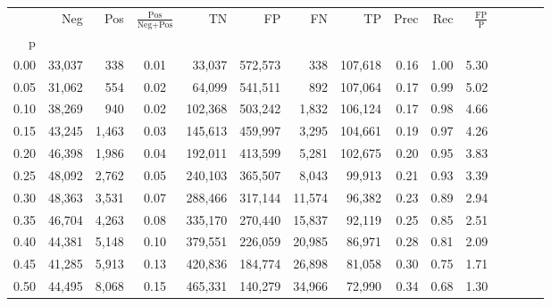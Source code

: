 \begin{tabular}{rrrcrrrrrrrrrrr}
\toprule
{} &     Neg &     Pos & $\frac{\text{Pos}}{\text{Neg}+\text{Pos}}$ &       TN &       FP &       FN &       TP &  Prec &   Rec & $\frac{\text{FP}}{\text{P}}$ \\
p    &         &         &                                            &          &          &          &          &       &       &                              \\
\midrule
0.00 &  33,037 &     338 &                                       0.01 &   33,037 &  572,573 &      338 &  107,618 &  0.16 &  1.00 &                         5.30 \\
0.05 &  31,062 &     554 &                                       0.02 &   64,099 &  541,511 &      892 &  107,064 &  0.17 &  0.99 &                         5.02 \\
0.10 &  38,269 &     940 &                                       0.02 &  102,368 &  503,242 &    1,832 &  106,124 &  0.17 &  0.98 &                         4.66 \\
0.15 &  43,245 &   1,463 &                                       0.03 &  145,613 &  459,997 &    3,295 &  104,661 &  0.19 &  0.97 &                         4.26 \\
0.20 &  46,398 &   1,986 &                                       0.04 &  192,011 &  413,599 &    5,281 &  102,675 &  0.20 &  0.95 &                         3.83 \\
0.25 &  48,092 &   2,762 &                                       0.05 &  240,103 &  365,507 &    8,043 &   99,913 &  0.21 &  0.93 &                         3.39 \\
0.30 &  48,363 &   3,531 &                                       0.07 &  288,466 &  317,144 &   11,574 &   96,382 &  0.23 &  0.89 &                         2.94 \\
0.35 &  46,704 &   4,263 &                                       0.08 &  335,170 &  270,440 &   15,837 &   92,119 &  0.25 &  0.85 &                         2.51 \\
0.40 &  44,381 &   5,148 &                                       0.10 &  379,551 &  226,059 &   20,985 &   86,971 &  0.28 &  0.81 &                         2.09 \\
0.45 &  41,285 &   5,913 &                                       0.13 &  420,836 &  184,774 &   26,898 &   81,058 &  0.30 &  0.75 &                         1.71 \\
0.50 &  44,495 &   8,068 &                                       0.15 &  465,331 &  140,279 &   34,966 &   72,990 &  0.34 &  0.68 &                         1.30 \\

\end{tabular}
